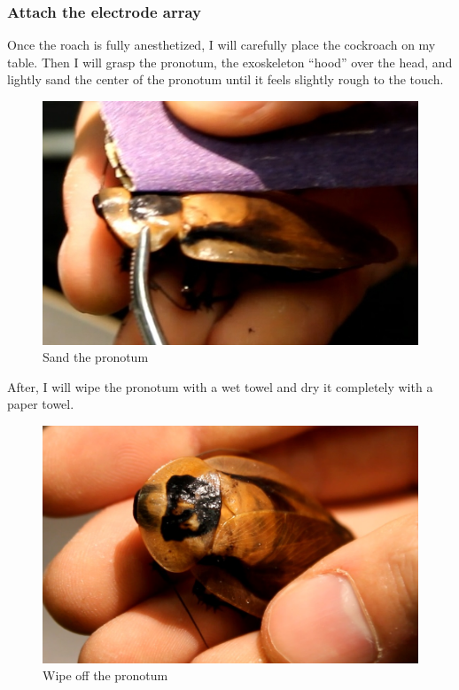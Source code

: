\subsubsection{Attach the electrode array}
Once the roach is fully anesthetized, I will carefully place the cockroach on my table. Then I will grasp the pronotum, the exoskeleton ``hood'' over the head, and lightly sand the center of the pronotum until it feels slightly rough to the touch. 
{\begin{figure}[ht!]
\centering
\includegraphics[scale=0.25]{Surgery Photos/sand.jpg}
\caption{Sand the pronotum}
\label{fig:sand}
\end{figure}}
After, I will wipe the pronotum with a wet towel and dry it completely with a paper towel. 
{\begin{figure}[ht!]
\centering
\includegraphics[scale=0.15]{Surgery Photos/wipe.jpg}
\caption{Wipe off the pronotum}
\label{fig:wipe}
\end{figure}}
